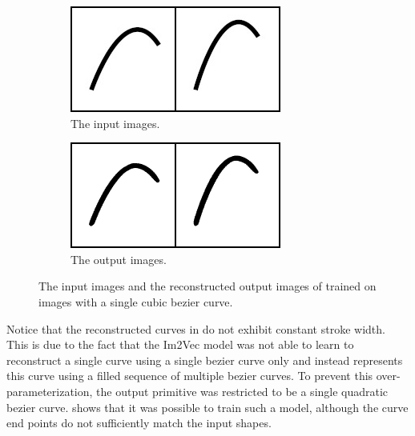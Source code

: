 \begin{figure}
    \centering
    \begin{subfigure}{.45\textwidth}
        \includegraphics[width=\textwidth]{graphics/work-artifacts/im2vec/447/real_img_VectorVAEnLayers_2497.png}
        \caption{The input images.}
    \end{subfigure}
    \begin{subfigure}{.45\textwidth}
        \includegraphics[width=\textwidth]{graphics/work-artifacts/im2vec/447/recons_VectorVAEnLayers_2497.png}
        \caption{The output images.}
    \end{subfigure}
    \caption{The input images and the reconstructed output images of \citep{DBLP:conf/cvpr/Reddy21} trained on images with a single cubic bezier curve.}
    \label{fig:447.recons}
\end{figure}

Notice that the reconstructed curves in  do not exhibit constant stroke width. This is due to the fact that the Im2Vec model was not able to learn to reconstruct a single curve using a single bezier curve only and instead represents this curve using a filled sequence of multiple bezier curves. To prevent this over-parameterization, the output primitive was restricted to be a single quadratic bezier curve.  shows that it was possible to train such a model, although the curve end points do not sufficiently match the input shapes.

